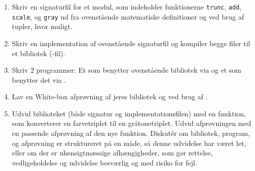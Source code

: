 \documentclass[a4paper,12pt]{article}
\begin{document}
\begin{enumerate}[label=4ø.\arabic*,start=0]
\item Skriv en signaturfil for et modul, som indeholder funktionerne \lstinline{trunc}, \lstinline{add}, \lstinline{scale}, og \lstinline{gray} ud fra ovenstående matematiske definitioner og ved brug af tupler, hvor muligt.
\item Skriv en implementation af ovenstående signaturfil og kompiler begge filer til et bibliotek (-fil).
\item Skriv 2 programmer: Et som benytter ovenstående bibliotek via  og et som benytter det via .
\item Lav en White-box afprøvning af jeres bibliotek og ved brug af .
\item Udvid biblioteket (både signatur og implementationsfilen) med en funktion, som konverterer en farvetriplet til en gråtonetriplet. Udvid afprøvningen med en passende afprøvning af den nye funktion. Diskut\'{e}r om bibliotek, program, og afprøvning er struktureret på en måde, så denne udvidelse har været let, eller om der er uhensigtmæssige afhængigheder, som gør rettelse, vedligeholdelse og udvidelse besværlig og med risiko for fejl.
\end{enumerate}
\end{document}
